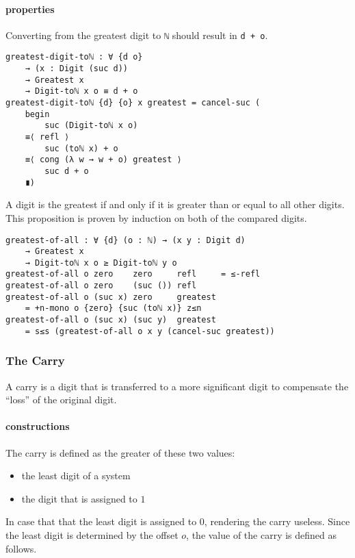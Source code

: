\documentclass[../thesis.tex]{subfiles}
\begin{document}
\paragraph{properties}

Converting from the greatest digit to {\lstinline|ℕ|} should result in {\lstinline|d + o|}.

\begin{lstlisting}
greatest-digit-toℕ : ∀ {d o}
    → (x : Digit (suc d))
    → Greatest x
    → Digit-toℕ x o ≡ d + o
greatest-digit-toℕ {d} {o} x greatest = cancel-suc (
    begin
        suc (Digit-toℕ x o)
    ≡⟨ refl ⟩
        suc (toℕ x) + o
    ≡⟨ cong (λ w → w + o) greatest ⟩
        suc d + o
    ∎)
\end{lstlisting}

A digit is the greatest if and only if it is greater than or equal to all other
digits. This proposition is proven by induction on both of the compared digits.

\begin{lstlisting}
greatest-of-all : ∀ {d} (o : ℕ) → (x y : Digit d)
    → Greatest x
    → Digit-toℕ x o ≥ Digit-toℕ y o
greatest-of-all o zero    zero     refl     = ≤-refl
greatest-of-all o zero    (suc ()) refl
greatest-of-all o (suc x) zero     greatest
    = +n-mono o {zero} {suc (toℕ x)} z≤n
greatest-of-all o (suc x) (suc y)  greatest
    = s≤s (greatest-of-all o x y (cancel-suc greatest))
\end{lstlisting}

\subsubsection{The Carry}

A carry is a digit that is transferred to a more significant digit to compensate
the ``loss'' of the original digit.

\paragraph{constructions}

The carry is defined as the greater of these two values:

\begin{itemize}
    \item the least digit of a system
    \item the digit that is assigned to $ 1 $
\end{itemize}

In case that that the least digit is assigned to $ 0 $, rendering the carry useless.
Since the least digit is determined by the offset $ o $, the value of the carry
is defined as follows.
\end{document}
